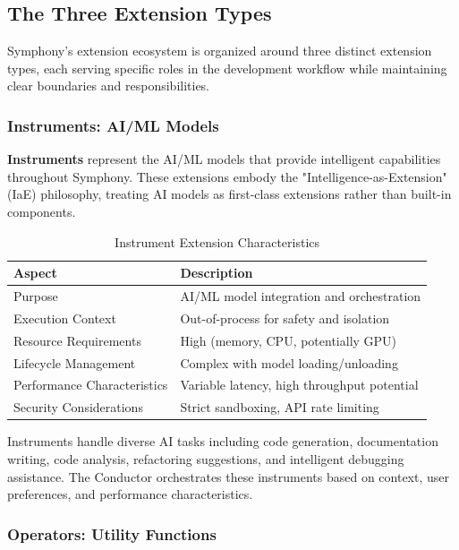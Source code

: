 \subsection{The Three Extension Types}
\label{subsec:three-extension-types}

Symphony's extension ecosystem is organized around three distinct extension types, each serving specific roles in the development workflow while maintaining clear boundaries and responsibilities.

\subsubsection{Instruments: AI/ML Models}
\label{subsubsec:instruments}

\textcolor{brandPrimary}{\textbf{Instruments}} represent the AI/ML models that provide intelligent capabilities throughout Symphony. These extensions embody the "Intelligence-as-Extension" (IaE) philosophy, treating AI models as first-class extensions rather than built-in components.

\begin{table}[h]
\centering
\caption{Instrument Extension Characteristics}
\label{tab:instrument-characteristics}
\begin{tabular}{@{}ll@{}}
\toprule
\textbf{Aspect} & \textbf{Description} \\
\midrule
Purpose & AI/ML model integration and orchestration \\
Execution Context & Out-of-process for safety and isolation \\
Resource Requirements & High (memory, CPU, potentially GPU) \\
Lifecycle Management & Complex with model loading/unloading \\
Performance Characteristics & Variable latency, high throughput potential \\
Security Considerations & Strict sandboxing, API rate limiting \\
\bottomrule
\end{tabular}
\end{table}

Instruments handle diverse AI tasks including code generation, documentation writing, code analysis, refactoring suggestions, and intelligent debugging assistance. The Conductor orchestrates these instruments based on context, user preferences, and performance characteristics.

\subsubsection{Operators: Utility Functions}
\label{subsubsec:operators}

